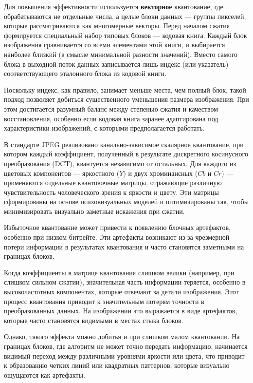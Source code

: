 Для повышения эффективности используется \textbf{векторное} квантование, где обрабатываются не отдельные числа, 
а целые блоки данных — группы пикселей, которые рассматриваются как многомерные векторы. 
Перед началом сжатия формируется специальный набор типовых блоков — кодовая книга. 
Каждый блок изображения сравнивается со всеми элементами этой книги, и выбирается наиболее близкий (в смысле минимальной разности значений). 
Вместо самого блока в выходной поток данных записывается лишь индекс (или указатель) соответствующего эталонного блока из кодовой книги.

Поскольку индекс, как правило, занимает меньше места, чем полный блок, такой подход позволяет добиться существенного уменьшения размера изображения. 
При этом достигается разумный баланс между степенью сжатия и качеством восстановления, 
особенно если кодовая книга заранее адаптирована под характеристики изображений, с которыми предполагается работать.

В стандарте JPEG реализовано канально-зависимое скалярное квантование, при котором каждый коэффициент, 
полученный в результате дискретного косинусного преобразования (DCT), квантуется независимо от остальных. 
Для каждого из цветовых компонентов — яркостного ($Y$) и двух хроминансных ($Cb$ и $Cr$) — применяются отдельные квантовочные матрицы, 
отражающие различную чувствительность человеческого зрения к яркости и цвету. 
Эти матрицы сформированы на основе психовизуальных моделей и оптимизированы так, 
чтобы минимизировать визуально заметные искажения при сжатии.

\YQuantize

\CbCrQuantize

Избыточное квантование может привести к появлению блочных артефактов, особенно при низком битрейте. 
Эти артефакты возникают из-за чрезмерной потери информации в результатах квантования и часто становятся заметными на границах блоков.

Когда коэффициенты в матрице квантования слишком велики (например, при слишком сильном сжатии), 
значительная часть информации теряется, особенно в высокочастотных компонентах, которые отвечают за детали изображения. 
Этот процесс квантования приводит к значительным потерям точности в преобразованных данных. 
На изображении это выражается в виде артефактов, которые часто становятся видимыми в местах стыка блоков.

Однако, такого эффекта можно добитья и при слишком малом квантовании.
На границах блоков, где алгоритм не может точно передать информацию, 
начинается видимый переход между различными уровнями яркости или цвета, 
что приводит к образованию четких линий или квадратных паттернов, которые визуально ощущаются как артефакты.

